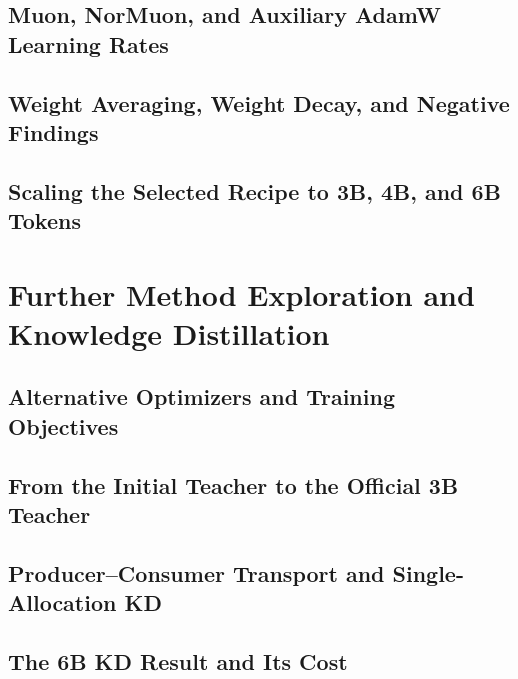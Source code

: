 \subsection{Muon, NorMuon, and Auxiliary AdamW Learning Rates}
\subsection{Weight Averaging, Weight Decay, and Negative Findings}
\subsection{Scaling the Selected Recipe to 3B, 4B, and 6B Tokens}

\section{Further Method Exploration and Knowledge Distillation}
\label{sec:distillation}
\subsection{Alternative Optimizers and Training Objectives}
\subsection{From the Initial Teacher to the Official 3B Teacher}
\subsection{Producer--Consumer Transport and Single-Allocation KD}
\subsection{The 6B KD Result and Its Cost}
